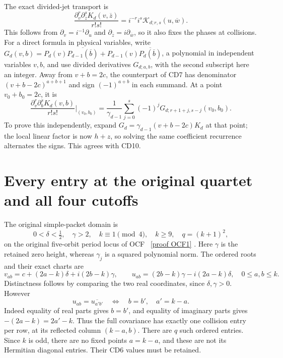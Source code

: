 \documentclass[11pt]{article}
\begin{document}
The exact divided-jet transport is
\begin{equation}\label{eq:S-jets}
 \frac{\partial_v^r\partial_{\overline z}^sK_d(v,\overline z)}{r!s!}
   =i^{-r}i^s\mathcal K_{d;r,s}(u,\overline w).
 \tag{CD10}
\end{equation}
This follows from \(\partial_v=i^{-1}\partial_u\) and
\(\partial_{\overline z}=i\partial_{\overline w}\), so it also
fixes the phases at collisions. For a direct formula in physical
variables, write \(G_d(v,b)=P_d(v)\overline{P_{d-1}(\overline b)}+
P_{d-1}(v)\overline{P_d(\overline b)}\), a polynomial in independent
variables \(v,b\), and use divided derivatives \(G_{d;a,b}\), with
the second subscript here an integer. Away from \(v+b=2c\), the
counterpart of CD7 has denominator \((v+b-2c)^{a+b+1}\) and sign
\((-1)^{a+b}\) in each summand. At a point \(v_0+b_0=2c\), it is
\begin{equation}\label{eq:S-jets-collision}
 \frac{\partial_v^r\partial_b^sK_d(v,b)}{r!s!}
 \bigg|_{(v_0,b_0)}
  =\frac1{\gamma_{d-1}}
      \sum_{j=0}^s(-1)^jG_{d;r+1+j,s-j}(v_0,b_0).
 \tag{CD11}
\end{equation}
To prove this independently, expand
\(G_d=\gamma_{d-1}(v+b-2c)K_d\) at that point; the local linear
factor is now \(h+z\), so solving the same coefficient recurrence
alternates the signs. This agrees with CD10.

\section{Every entry at the original quartet and all four cutoffs}

The original simple-packet domain is
\[
 0<\delta<\tfrac12,\quad \gamma>2,\quad k\equiv1\pmod4,
 \quad k\geq9,\quad q=(k+1)^2,
\]
on the original five-orbit period locus of OCF \cite{OCF}%
~\href{https://github.com/KokunoYumeto/zeta-function-research-reader/blob/5992ad50c0f2a06921f1fcaded7b4e38097c0739/workbenches/splitzero-tandem/continuations/20260920-original-kernel-mixed-determinants/providers/ORIGINAL_CONDUCTOR_STRIP_FRAME.tex\#L27}{[proof OCF1]}%
{}. Here
\(\gamma\) is the retained zero height, whereas \(\gamma_j\) is a
squared polynomial norm. The ordered roots and their exact charts are
\begin{equation}\label{eq:roots}
 v_{ab}=c+(2a-k)\delta+i(2b-k)\gamma,
 \qquad u_{ab}=(2b-k)\gamma-i(2a-k)\delta,
 \quad 0\leq a,b\leq k.
 \tag{CD12}
\end{equation}
Distinctness follows by comparing the two real coordinates, since
\(\delta,\gamma>0\). However
\[
 u_{ab}=\overline{u_{a'b'}}
 \quad\Longleftrightarrow\quad b=b',\quad a'=k-a.
\]
Indeed equality of real parts gives \(b=b'\), and equality of imaginary
parts gives \(-(2a-k)=2a'-k\). Thus the full covariance has exactly
one collision entry per row, at its reflected column \((k-a,b)\).
There are \(q\) such ordered entries. Since \(k\) is odd, there are no
fixed points \(a=k-a\), and these are not its Hermitian diagonal
entries. Their CD6 values must be retained.
\end{document}

